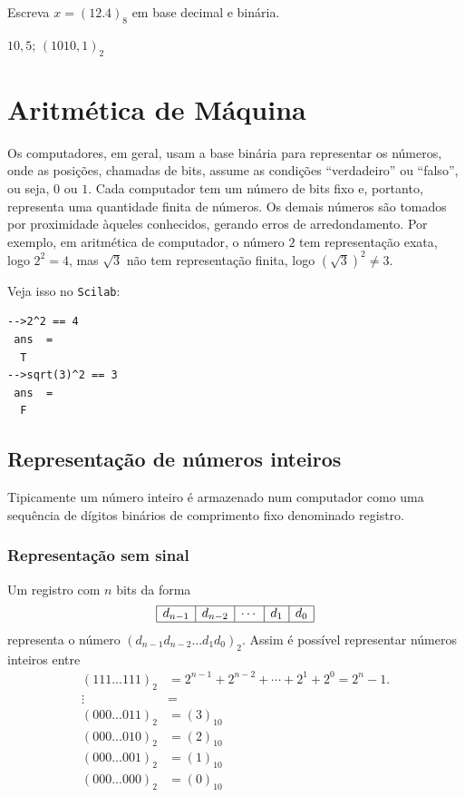 \documentclass[main.tex]{subfiles}
\begin{document}
\begin{Exercise} Escreva $x=(12.4)_8$ em base decimal e binária.
\end{Exercise}
\begin{Answer}
  \begin{tiny}
    $10,5$; $(1010,1)_2$
  \end{tiny}
\end{Answer}


\section{Aritmética de Máquina}

Os computadores, em geral, usam a base binária para representar os números, onde as posições, chamadas de bits, assume as condições ``verdadeiro'' ou ``falso'', ou seja, $0$ ou $1$. Cada computador tem um número de bits fixo e, portanto, representa uma quantidade finita de números. Os demais números são tomados por proximidade àqueles conhecidos, gerando erros de arredondamento. Por exemplo, em aritmética de computador, o número $2$ tem representação exata, logo $2^2=4$, mas $\sqrt{3}$ não tem representação finita, logo $(\sqrt{3})^2\neq 3$. 

\ifisscilab
Veja isso no \verb+Scilab+:
\begin{verbatim}
-->2^2 == 4
 ans  =
  T  
-->sqrt(3)^2 == 3
 ans  =
  F  
\end{verbatim}
\fi

\subsection{Representação de números inteiros}

Tipicamente um número inteiro é armazenado num computador como uma sequência de dígitos binários de comprimento fixo denominado registro.

\subsubsection{Representação sem sinal}
Um registro com $n$ bits da forma
\begin{equation*}
\begin{array}{|c|c|c|c|c|} \hline
d_{n-1}&d_{n-2}&\cdots&d_1&d_0\\\hline
\end{array}  
\end{equation*}
representa o número $(d_{n-1}d_{n-2}...d_1d_0)_2$. Assim é possível representar números inteiros entre
\begin{equation*}
\begin{array}{cl}
  (111...111)_2 & = 2^{n-1}+2^{n-2}+\cdots+2^1+2^0=2^n-1.\\
    \vdots      & = \\
  (000...011)_2 &= (3)_{10} \\
  (000...010)_2 &= (2)_{10} \\
  (000...001)_2 &= (1)_{10} \\
  (000...000)_2 & =(0)_{10} \\
\end{array}
\end{equation*}
\end{document}
